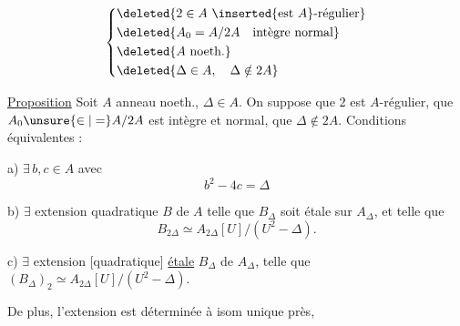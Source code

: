 \[
\left\{\begin{aligned}&\deleted{2\in A\ \inserted{\text{est }A}\text{-régulier}}\\&\deleted{A_0=A/2A\quad\text{intègre normal}}\\&\deleted{A\ \text{noeth.}}\\&\deleted{\Delta\in A,\quad\Delta\notin2A}\end{aligned}\right.
\]

\uline{Proposition} Soit $A$ anneau noeth., $\Delta\in A$. On suppose que $2$ est $A$-régulier, que $A_0\unsure{\in|=}A/2A$ est intègre et normal, que $\Delta\notin2A$. Conditions équivalentes :

a) $\exists\, b,c\in A$ avec
\[
b^2-4c=\Delta
\]

b) $\exists$ extension quadratique $B$ de $A$ telle que $B_{\Delta}$ soit étale sur $A_{\Delta}$, et telle que
\[
B_{2\Delta}\simeq A_{2\Delta}[U]/(U^2-\Delta).
\]

c) $\exists$ extension [quadratique]  \uline{étale} $B_{\Delta}$ de $A_{\Delta}$, telle que $(B_{\Delta})_2\simeq A_{2\Delta}[U]/(U^2-\Delta)$.

De plus, l'extension   est déterminée à isom unique près,
